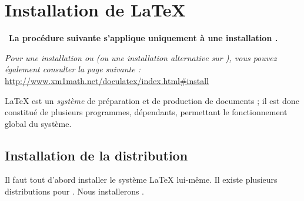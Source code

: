 \renewcommand\MaCouleur{ForestGreen}
\chapter{Installation de LaTeX}
\thispagestyle{empty}

\ {\bfseries La procédure suivante s'applique uniquement à une installation \windows.}\par
{\itshape Pour une installation \linux ou \mac (ou une installation alternative sur \windows), vous pouvez également consulter la page suivante :}
\url{http://www.xm1math.net/doculatex/index.html#install}\bigskip

\LaTeX{} est un \textit{système} de préparation et de production de documents ; il est donc constitué de plusieurs programmes, dépendants, permettant le fonctionnement global du système.

\section{Installation de la distribution}

Il faut tout d'abord installer le système \LaTeX{} lui-même. Il existe plusieurs distributions pour \windows. Nous installerons .

